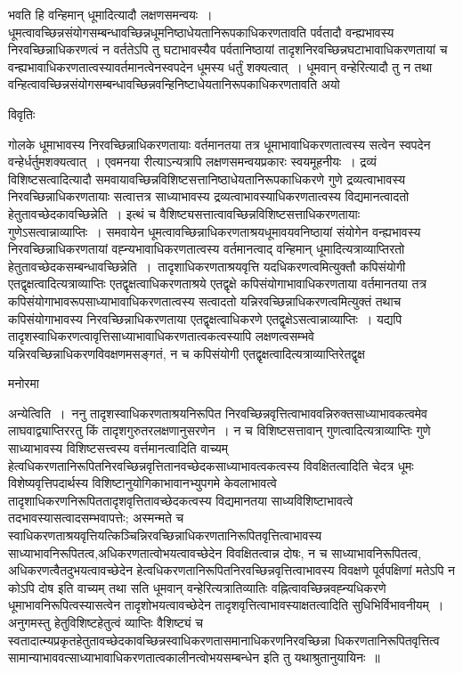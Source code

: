 \documentclass[10pt, openany]{book}
\begin{document}
{भवति हि वन्हिमान् धूमादित्यादौ लक्षणसमन्वयः~। धूमत्वावच्छिन्नसंयोगसम्बन्धावच्छिन्नधूमनिष्ठाधेयतानिरूपकाधिकरणतावति पर्वतादौ वन्ह्यभावस्य निरवच्छिन्नाधिकरणत्वं न वर्ततेऽपि तु घटाभावस्यैव पर्वतानिष्ठायां तादृशनिरवच्छिन्नघटाभावाधिकरणतायां च वन्ह्यभावाधिकरणतात्वस्यावर्तमानत्वेनस्वपदेन धूमस्य धर्तुं शक्यत्वात्~। धूमवान् वन्हेरित्यादौ तु न तथा वन्हित्वावच्छिन्नसंयोगसम्बन्धावच्छिन्नवन्हिनिष्टाधेयतानिरूपकाधिकरणतावति अयो\textendash
\newpage
\begin{center}     विवृतिः \end{center}
गोलके धूमाभावस्य निरवच्छिन्नाधिकरणतायाः वर्तमानतया तत्र धूमाभावाधिकरणतात्वस्य सत्वेन स्वपदेन वन्हेर्धर्तुमशक्यत्वात्~। एवमनया रीत्याऽन्यत्रापि लक्षणसमन्वयप्रकारः स्वयमूहनीयः~। द्रव्यं विशिष्टसत्वादित्यादौ समवायावच्छिन्नविशिष्टसत्तानिष्ठाधेयतानिरूपकाधिकरणे गुणे द्रव्यत्वाभावस्य निरवच्छिन्नाधिकरणतायाः सत्वात्तत्र साध्याभावस्य द्रव्यत्वाभावस्याधिकरणतात्वस्य विद्यमानत्वादतो हेतुतावच्छेदकावच्छिन्नेति~। इत्थं च वैशिष्ट्यसत्तात्वावच्छिन्नविशिष्टसत्ताधिकरणतायाः गुणेऽसत्वान्नाव्याप्तिः~। समवायेन
धूमत्वावच्छिन्नाधिकरणताश्रयधूमावयवनिष्ठायां संयोगेन वन्ह्यभावस्य निरवच्छिन्नाधिकरणतायां वह्न्यभावाधिकरणतात्वस्य वर्तमानत्वाद् वन्हिमान् धूमादित्यत्राव्याप्तिरतो हेतुतावच्छेदकसम्बन्धावच्छिन्नेति~।~तादृशाधिकरणताश्रयवृत्ति यदधिकरणत्वमित्युक्तौ कपिसंयोगी एतद्वृक्षत्वादित्यत्राव्याप्तिः एतद्वृक्षत्वाधिकरणताश्रये एतद्वृक्षे कपिसंयोगाभावाधिकरणताया वर्तमानतया तत्र कपिसंयोगाभावरूपसाध्याभावाधिकरणतात्वस्य सत्वादतो यन्निरवच्छिन्नाधिकरणत्वमित्युक्तं तथाच कपिसंयोगाभावस्य निरवच्छिन्नाधिकरणताया एतद्वृक्षत्वाधिकरणे एतद्वृक्षेऽसत्वान्नाव्याप्तिः~। यद्यपि तादृशस्वाधिकरणत्वावृत्तिसाध्याभावाधिकरणतात्वकत्वस्यापि लक्षणत्वसम्भवे
यन्निरवच्छिन्नाधिकरणविवक्षणमसङ्गतं, न च कपिसंयोगी एतद्वृक्षत्वादित्यत्राव्याप्तिरेतद्वृक्ष
\begin{center}   मनोरमा  \end{center}

अन्येत्विति~।~ननु तादृशस्वाधिकरणताश्रयनिरूपित निरवच्छिन्नवृत्तित्वाभाववन्निरुक्तसाध्याभावकत्वमेव लाघवाद्व्याप्तिररतु किं तादृशगुरुतरलक्षणानुसरणेन~। न च
विशिष्टसत्तावान् गुणत्वादित्यत्राव्याप्तिः गुणे साध्याभावस्य विशिष्टसत्त्वस्य वर्त्तमानत्वादिति वाच्यम् हेत्वधिकरणतानिरूपितनिरवच्छिन्नवृत्तितानवच्छेदकसाध्याभावत्वकत्वस्य विवक्षितत्वादिति चेदत्र धूमः विशेष्यवृत्तिपदार्थस्य विशिष्टानुयोगिकाभावानभ्युपगमे केवलाभावत्वे तादृशाधिकरणनिरूपिततादृशवृत्तितावच्छेदकत्वस्य विद्यमानतया साध्यविशिष्टाभावत्वे तदभावस्यासत्वादसम्भवापत्तेः; अस्मन्मते च स्वाधिकरणताश्रयवृत्तियत्किञ्चिन्निरवच्छिन्नाधिकरणतानिरूपितवृत्तित्वाभावस्य साध्याभावनिरूपितत्व,अधिकरणतात्वोभयत्वावच्छेदेन विवक्षितत्वान्न दोषः, न च साध्याभावनिरूपितत्व, अधिकरणत्वैतदुभयत्वावच्छेदेन हेत्वधिकरणतानिरूपितनिरवच्छिन्नवृत्तित्वाभावस्य विवक्षणे पूर्वपक्षिणां मतेऽपि न कोऽपि दोष इति वाच्यम् तथा सति धूमवान् वन्हेरित्यत्रातिव्यातिः वह्नित्वावच्छिन्नवह्न्यधिकरणे धूमाभावनिरूपित्वस्यासत्वेन तादृशोभयत्वावच्छेदेन तादृशवृत्तित्वाभावस्याक्षतत्वादिति सुधिभिर्विभावनीयम्~। अनुगमस्तु हेतुविशिष्टहेतुत्वं
व्याप्तिः वैशिष्ट्यं च स्वतादात्म्यप्रकृतहेतुतावच्छेदकावच्छिन्नस्वाधिकरणतासमानाधिकरणनिरवच्छिन्ना धिकरणतानिरूपितवृत्तित्व सामान्याभाववत्साध्याभावाधिकरणतात्वकालीनत्वोभयसम्बन्धेन इति तु यथाश्रुतानुयायिनः~॥

}
\end{document}
